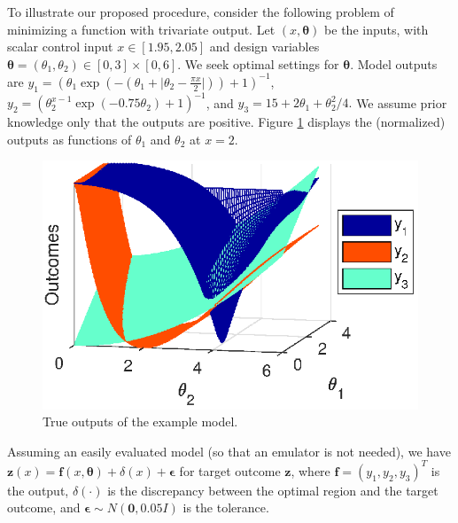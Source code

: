 \documentclass[12pt]{article}
\begin{document}
%
To illustrate our proposed procedure, consider the following problem of minimizing a function with trivariate output.
%
Let $(x,\boldsymbol \theta)$ be the inputs, with scalar control input $x\in[1.95,2.05]$ and design variables $\boldsymbol \theta = (\theta_1,\theta_2)\in[0,3]\times[0,6]$.
%
We seek optimal settings for $\boldsymbol\theta$.
%
Model outputs are
%
$
y_1 = \left(\theta_1 \exp\left(-\left(\theta_1 + \lvert \theta_2-\frac{\pi x}2\rvert \right)\right)+1\right)^{-1}$,
$
y_2 = \left(\theta_2^{x-1} \exp\left(-0.75 \theta_2\right) + 1 \right)^{-1}
$, and
$
y_3 = 15 + 2 \theta_1 + {\theta_2^2}/4.
$
%
We assume prior knowledge only that the outputs are positive.
%
Figure \ref{fig:toy_sim_outputs} displays the (normalized) outputs as functions of $\theta_1$ and $\theta_2$ at $x = 2$.
%
\begin{figure}
\centering
\includegraphics[scale=.8]{FIG_toy_sim_model_outputs.eps}
\caption{True outputs of the example model.}
\label{fig:toy_sim_outputs}
\end{figure}
%
Assuming an easily evaluated model (so that an emulator is not needed), we have
%
$
\mathbf z(x) = \mathbf f(x,\boldsymbol \theta) + \delta(x) + \boldsymbol\epsilon
$
%
for target outcome $\mathbf z$, where $\mathbf f = (y_1,y_2,y_3)^T$ is the output, $\delta(\cdot)$ is the discrepancy between the optimal region and the target outcome, and $\boldsymbol \epsilon\sim N(\mathbf 0,0.05I)$ is the tolerance.
%
%
\end{document}
